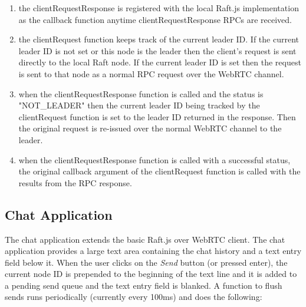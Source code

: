 \documentclass[9pt]{extarticle}
\begin{document}
\begin{multicols}{2}
\begin{enumerate}
\item the clientRequestResponse is registered with the local Raft.js
    implementation as the callback function anytime
    clientRequestResponse RPCs are received.
\item the clientRequest function keeps track of the current leader ID.
    If the current leader ID is not set or this node is the leader
    then the client's request is sent directly to the local Raft node.
    If the current leader ID is set then the request is sent to that
    node as a normal RPC request over the WebRTC channel.
\item when the clientRequestResponse function is called and the status
    is "NOT\_LEADER" then the current leader ID being tracked by the
    clientRequest function is set to the leader ID returned in the
    response. Then the original request is re-issued over the normal
    WebRTC channel to the leader.
\item when the clientRequestResponse function is called with
    a successful status, the original callback argument of the
    clientRequest function is called with the results from the RPC
    response.
\end{enumerate}

\subsection{Chat Application}

The chat application extends the basic Raft.js over WebRTC client. The
chat application provides a large text area containing the chat
history and a text entry field below it. When the user clicks on the
\emph{Send} button (or pressed enter), the current node ID is
prepended to the beginning of the text line and it is added to
a pending send queue and the text entry field is blanked. A function
to flush sends runs periodically (currently every 100ms) and does the
following:


\end{multicols}
\end{document}
